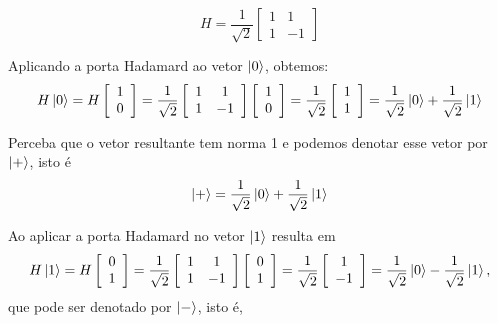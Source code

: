 $$
    \label{eq:hadamard}
    H=\dfrac{1}{\sqrt{2}}\left[\begin{array}{cc}
            1 & 1 \\
            1 & -1
    \end{array}\right]
$$

Aplicando a porta Hadamard ao vetor $\ket{0}$, obtemos:
$$
    \label{eq:aplicacao_hadamard_0}
    H\ket{0}=H\left[\begin{array}{c}
            1 \\
            0
    \end{array}\right] = \dfrac{1}{\sqrt{2}}\left[\begin{array}{cc}
            1 & 1 \\
            1 & -1
    \end{array}\right]\left[\begin{array}{c}
            1 \\
            0
    \end{array}\right]=\dfrac{1}{\sqrt{2}}\left[\begin{array}{c}
            1 \\
            1
    \end{array}\right]=\dfrac{1}{\sqrt{2}}\ket{0}+\dfrac{1}{\sqrt{2}}\ket{1}
$$
    
Perceba que o vetor resultante tem norma 1 e podemos denotar esse vetor por $\ket{+}$, isto é
    $$
        \label{eq:ket_mais}
        \ket{+}=\dfrac{1}{\sqrt{2}}\ket{0}+\dfrac{1}{\sqrt{2}}\ket{1}
    $$
    
    Ao aplicar a porta Hadamard no vetor $\ket{1}$ resulta em
    $$
        \label{eq:aplicacao_hadamard_1}
        H\ket{1}=H\left[\begin{array}{c}
             0\\
             1
        \end{array}\right] = \dfrac{1}{\sqrt{2}}\left[\begin{array}{cc}
             1 & 1 \\
             1 & -1
        \end{array}\right]\left[\begin{array}{c}
             0\\
             1
        \end{array}\right]=\dfrac{1}{\sqrt{2}}\left[\begin{array}{c}
             1 \\
             -1
        \end{array}\right]=\dfrac{1}{\sqrt{2}}\ket{0}-\dfrac{1}{\sqrt{2}}\ket{1},
    $$
que pode ser denotado por $\ket{-}$, isto é, 

